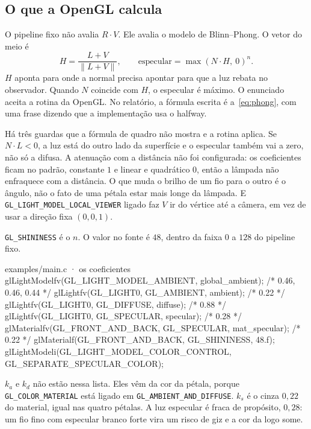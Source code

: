 \documentclass[11pt,a4paper]{article}
\newcommand{\fn}[1]{\texttt{\nobreak\hspace{0pt}#1}}
\begin{document}
\subsection{O que a OpenGL calcula}

O pipeline fixo não avalia \(R\cdot V\). Ele avalia o modelo de Blinn--Phong. O vetor do meio é
\begin{equation}
  H = \frac{L + V}{\|L + V\|},
  \qquad
  \text{especular} = \max(N\cdot H,\ 0)^{n}.
  \label{eq:blinn}
\end{equation}
\(H\) aponta para onde a normal precisa apontar para que a luz rebata no observador. Quando \(N\) coincide com \(H\), o especular é máximo. O enunciado aceita a rotina da OpenGL. No relatório, a fórmula escrita é a~\eqref{eq:phong}, com uma frase dizendo que a implementação usa o halfway.

Há três guardas que a fórmula de quadro não mostra e a rotina aplica. Se \(N\cdot L < 0\), a luz está do outro lado da superfície e o especular também vai a zero, não só a difusa. A atenuação com a distância não foi configurada: os coeficientes ficam no padrão, constante \(1\) e linear e quadrático \(0\), então a lâmpada não enfraquece com a distância. O que muda o brilho de um fio para o outro é o ângulo, não o fato de uma pétala estar mais longe da lâmpada. E \fn{GL\_LIGHT\_MODEL\_LOCAL\_VIEWER} ligado faz \(V\) ir do vértice até a câmera, em vez de usar a direção fixa \((0, 0, 1)\).

\fn{GL\_SHININESS} é o \(n\). O valor no fonte é \(48\), dentro da faixa \(0\) a \(128\) do pipeline fixo.

\begin{codigo}{examples/main.c · os coeficientes}
glLightModelfv(GL_LIGHT_MODEL_AMBIENT, global_ambient); /* 0.46, 0.46, 0.44 */
glLightfv(GL_LIGHT0, GL_AMBIENT, ambient);              /* 0.22 */
glLightfv(GL_LIGHT0, GL_DIFFUSE, diffuse);              /* 0.88 */
glLightfv(GL_LIGHT0, GL_SPECULAR, specular);            /* 0.28 */
glMaterialfv(GL_FRONT_AND_BACK, GL_SPECULAR, mat_specular); /* 0.22 */
glMaterialf(GL_FRONT_AND_BACK, GL_SHININESS, 48.f);
glLightModeli(GL_LIGHT_MODEL_COLOR_CONTROL, GL_SEPARATE_SPECULAR_COLOR);
\end{codigo}

\(k_a\) e \(k_d\) não estão nessa lista. Eles vêm da cor da pétala, porque \fn{GL\_COLOR\_MATERIAL} está ligado em \fn{GL\_AMBIENT\_AND\_DIFFUSE}. \(k_s\) é o cinza \(0{,}22\) do material, igual nas quatro pétalas. A luz especular é fraca de propósito, \(0{,}28\): um fio fino com especular branco forte vira um risco de giz e a cor da logo some.
\end{document}
